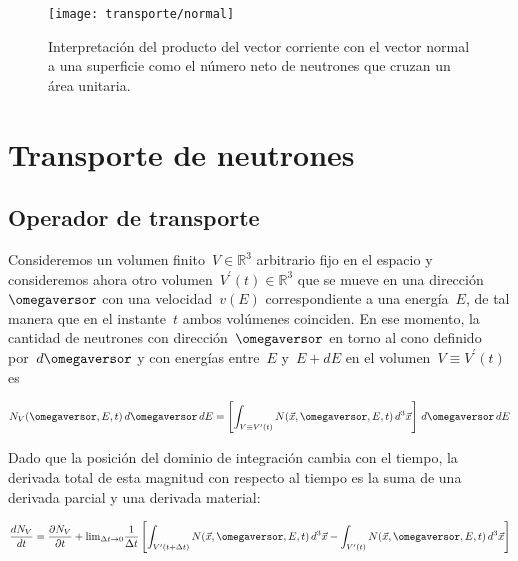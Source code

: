 \begin{figure}
\begin{center}
 \texttt{[image: transporte/normal]}
\end{center}
\caption{\label{fig:normal}Interpretación del producto del vector corriente con el vector normal a una superficie como el número neto de neutrones que cruzan un área unitaria.}
\end{figure}


\section{Transporte de neutrones} %

{\color{red}\lipsum[7]}

\subsection{Operador de transporte} %

Consideremos un volumen finito~$V\in \mathbb{R}^3$ arbitrario fijo en el espacio y consideremos ahora otro volumen~$V^{\prime}(t)\in \mathbb{R}^3$ que se mueve en una dirección~$\omegaversor$ con una velocidad~$v(E)$ correspondiente a una energía~$E$, de tal manera que en el instante~$t$ ambos volúmenes coinciden. En ese momento, la cantidad de neutrones con dirección~$\omegaversor$ en torno al cono definido por~$d\omegaversor$ y con energías entre~$E$ y~$E+dE$ en el volumen~$V \equiv V^{\prime}(t)$ es

\begin{equation}
\label{eq:nv}
 N_V(\omegaversor, E, t) \, d\omegaversor \, dE = \left[ \int_{V \equiv V^{\prime}(t)} N(\vec{x}, \omegaversor, E, t) \, d^3\vec{x} \right] \, d\omegaversor \, dE
\end{equation}

Dado que la posición del dominio de integración cambia con el tiempo, la derivada total de esta magnitud con respecto al tiempo es la suma de una derivada parcial y una derivada material:

\begin{equation}
\label{eq:integral_dos_dominios}
 \frac{dN_V}{dt} = \frac{\partial N_V}{\partial t} +
\text{lim}_{\Delta t \rightarrow 0} \frac{1}{\Delta t} \left[ \int_{V^{\prime}(t+\Delta t)} N(\vec{x}, \omegaversor, E, t) \, d^3\vec{x}  - \int_{V^{\prime}(t)} N(\vec{x}, \omegaversor, E, t) \, d^3\vec{x} \right]
\end{equation}

